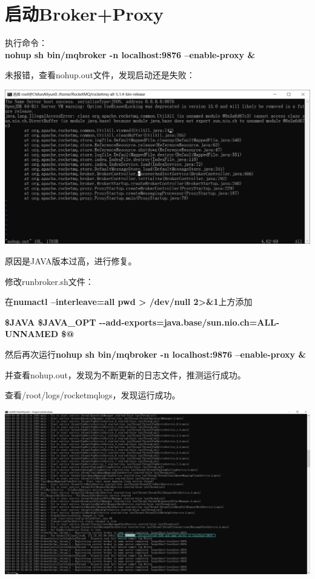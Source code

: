 \documentclass[11pt, a4paper, oneside, fontset=none]{ctexbook}
\begin{document}
\section{启动Broker+Proxy}
执行命令：\\{\bfseries\kaishu nohup sh bin/mqbroker -n localhost:9876 --enable-proxy \&}

未报错，查看nohup.out文件，发现启动还是失败：
\begin{center}
  \begin{minipage}{\textwidth}
    \center
    \includegraphics[width=\textwidth]{picture/broker启动失败.png}
    \captionsetup{hypcap=false}
    \label{fig:broker启动失败}
  \end{minipage}
\end{center}

原因是JAVA版本过高，进行修复。

修改runbroker.sh文件：

在{\bfseries\kaishu numactl --interleave=all pwd > /dev/null 2>\&1}上方添加

{\bfseries\kaishu \$JAVA \${JAVA\_OPT} {-}{-}add-exports=java.base/sun.nio.ch=ALL-UNNAMED \$@}


然后再次运行{\bfseries\kaishu nohup sh bin/mqbroker -n localhost:9876 –enable-proxy \&}

并查看nohup.out，发现为不断更新的日志文件，推测运行成功。

查看/root/logs/rocketmqlogs，发现运行成功。
\begin{center}
  \begin{minipage}{\textwidth}
    \center
    \includegraphics[width=\textwidth]{picture/broker启动成功.png}
    \captionsetup{hypcap=false}
    \label{fig:broker启动成功}
  \end{minipage}
\end{center}
\end{document}
